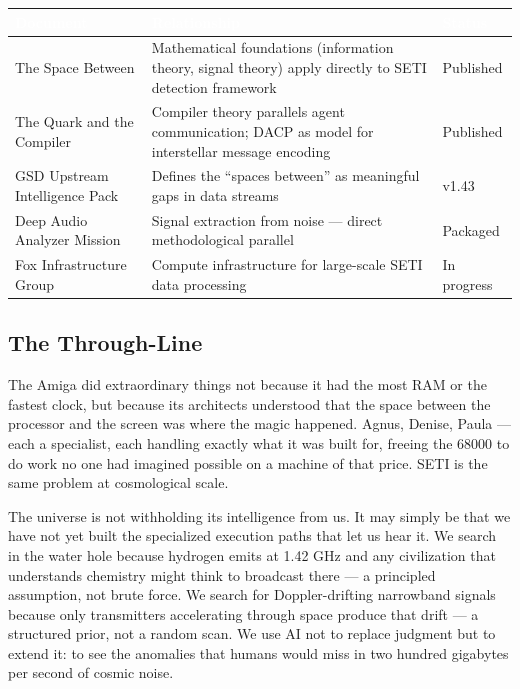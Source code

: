 \documentclass[11pt,letterpaper]{article}
\newcommand{\tableheader}[1]{\textbf{\sffamily\textcolor{white}{#1}}}
\begin{document}
\begin{center}
\begin{tabularx}{\textwidth}{L{4cm}XC{2.5cm}}
\toprule
{}
\tableheader{Document} & \tableheader{Relationship} & \tableheader{Status} \\
\midrule
The Space Between & Mathematical foundations (information theory, signal theory) apply directly to SETI detection framework & Published \\
The Quark and the Compiler & Compiler theory parallels agent communication; DACP as model for interstellar message encoding & Published \\
GSD Upstream Intelligence Pack & Defines the ``spaces between'' as meaningful gaps in data streams & v1.43 \\
Deep Audio Analyzer Mission & Signal extraction from noise --- direct methodological parallel & Packaged \\
Fox Infrastructure Group & Compute infrastructure for large-scale SETI data processing & In progress \\
\bottomrule
\end{tabularx}
\end{center}

\subsection{The Through-Line}

The Amiga did extraordinary things not because it had the most RAM or the fastest clock, but because its architects understood that the space between the processor and the screen was where the magic happened. Agnus, Denise, Paula --- each a specialist, each handling exactly what it was built for, freeing the 68000 to do work no one had imagined possible on a machine of that price. SETI is the same problem at cosmological scale.

The universe is not withholding its intelligence from us. It may simply be that we have not yet built the specialized execution paths that let us hear it. We search in the water hole because hydrogen emits at 1.42 GHz and any civilization that understands chemistry might think to broadcast there --- a principled assumption, not brute force. We search for Doppler-drifting narrowband signals because only transmitters accelerating through space produce that drift --- a structured prior, not a random scan. We use AI not to replace judgment but to extend it: to see the anomalies that humans would miss in two hundred gigabytes per second of cosmic noise.
\end{document}
